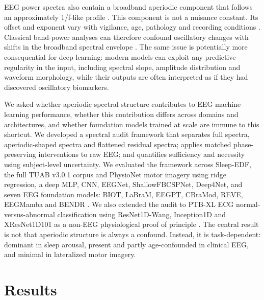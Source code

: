\documentclass[pdflatex,sn-nature]{sn-jnl}
\begin{document}
EEG power spectra also contain a broadband aperiodic component that follows an approximately 1/f-like profile \cite{donoghue2020parameterizing,wen2016separating,voytek2015age}. This component is not a nuisance constant. Its offset and exponent vary with vigilance, age, pathology and recording conditions \cite{lendner2020electrophysiological,voytek2015age,brake2024neurophysiological}. Classical band-power analyses can therefore confound oscillatory changes with shifts in the broadband spectral envelope \cite{donoghue2020parameterizing,gao2017inferring}. The same issue is potentially more consequential for deep learning: modern models can exploit any predictive regularity in the input, including spectral slope, amplitude distribution and waveform morphology, while their outputs are often interpreted as if they had discovered oscillatory biomarkers.

We asked whether aperiodic spectral structure contributes to EEG machine-learning performance, whether this contribution differs across domains and architectures, and whether foundation models trained at scale are immune to this shortcut. We developed a spectral audit framework that separates full spectra, aperiodic-shaped spectra and flattened residual spectra; applies matched phase-preserving interventions to raw EEG; and quantifies sufficiency and necessity using subject-level uncertainty. We evaluated the framework across Sleep-EDF, the full TUAB v3.0.1 corpus and PhysioNet motor imagery \cite{kemp2000sleep,kemp2013sleepedf,obeid2016tuh,schalk2004bci2000,goldberger2000physionet} using ridge regression, a deep MLP, CNN, EEGNet, ShallowFBCSPNet, Deep4Net, and seven EEG foundation models: BIOT, LaBraM, EEGPT, CBraMod, REVE, EEGMamba and BENDR \cite{lawhern2018eegnet,schirrmeister2017deep,yang2023biot,jiang2024labram,yue2024eegpt,wang2025cbramod,elouahidi2025reve,wang2025eegmamba,kostas2021bendr}. We also extended the audit to PTB-XL ECG normal-versus-abnormal classification using ResNet1D-Wang, Inception1D and XResNet1D101 as a non-EEG physiological proof of principle \cite{wagner2020ptbxl,wang2017timeseries,fawaz2020inceptiontime}. The central result is not that aperiodic structure is always a confound. Instead, it is task-dependent: dominant in sleep arousal, present and partly age-confounded in clinical EEG, and minimal in lateralized motor imagery.

\section{Results}
\end{document}
